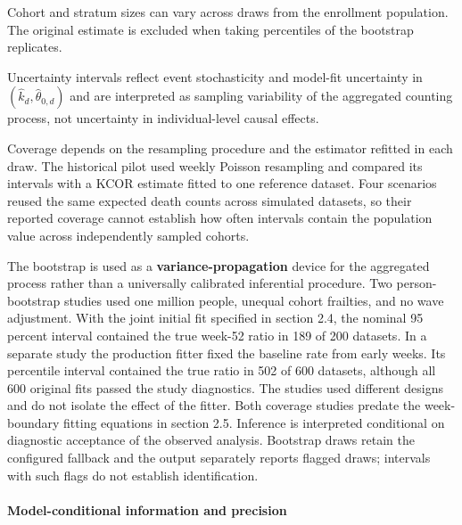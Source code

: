 \documentclass[
]{article}
\begin{document}
Cohort and stratum sizes can vary across draws from the enrollment population. The original estimate is excluded when taking percentiles of the bootstrap replicates.

Uncertainty intervals reflect event stochasticity and model-fit uncertainty in \((\hat{k}_d,\hat{\theta}_{0,d})\) and are interpreted as sampling variability of the aggregated counting process, not uncertainty in individual-level causal effects.

Coverage depends on the resampling procedure and the estimator refitted in each draw. The historical pilot used weekly Poisson resampling and compared its intervals with a KCOR estimate fitted to one reference dataset. Four scenarios reused the same expected death counts across simulated datasets, so their reported coverage cannot establish how often intervals contain the population value across independently sampled cohorts.

The bootstrap is used as a \textbf{variance-propagation} device for the aggregated process rather than a universally calibrated inferential procedure. Two person-bootstrap studies used one million people, unequal cohort frailties, and no wave adjustment. With the joint initial fit specified in section 2.4, the nominal 95 percent interval contained the true week-52 ratio in 189 of 200 datasets. In a separate study the production fitter fixed the baseline rate from early weeks. Its percentile interval contained the true ratio in 502 of 600 datasets, although all 600 original fits passed the study diagnostics. The studies used different designs and do not isolate the effect of the fitter. Both coverage studies predate the week-boundary fitting equations in section 2.5. Inference is interpreted conditional on diagnostic acceptance of the observed analysis. Bootstrap draws retain the configured fallback and the output separately reports flagged draws; intervals with such flags do not establish identification.

\paragraph{Model-conditional information and precision}\label{model-conditional-information-and-precision}
\end{document}
